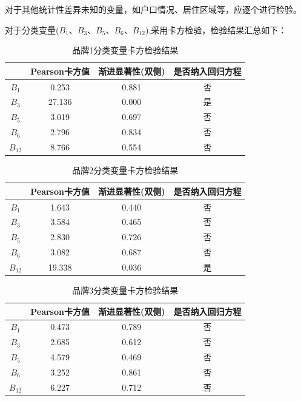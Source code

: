 \documentclass{JXUSTmodeling}
\begin{document}
对于其他统计性差异未知的变量，如户口情况、居住区域等，应逐个进行检验。

对于分类变量($ B_{1} $、$ B_{3} $、$ B_{5} $、$ B_{6} $、$ B_{12} $),采用卡方检验，检验结果汇总如下：
\begin{table}[!htbp]
	\centering 
	\caption{\label{tab:8}品牌1分类变量卡方检验结果}
	\begin{tabular}{cccc}
		\toprule[1.5pt]
		&Pearson卡方值&渐进显著性(双侧)&是否纳入回归方程\\
		\midrule
		$ B_{1} $&0.253&0.881&否\\
		$ B_{3} $&27.136&0.000&是\\
		$ B_{5} $&3.019&0.697&否\\
		$ B_{6} $&2.796&0.834&否\\
		$ B_{12} $&8.766&0.554&否\\
		
		
		\bottomrule[1.5pt]
	\end{tabular}
\end{table}
\begin{table}[!htbp]
	\centering 
	\caption{\label{tab:9}品牌2分类变量卡方检验结果}
	\begin{tabular}{cccc}
		\toprule[1.5pt]
		&Pearson卡方值&渐进显著性(双侧)&是否纳入回归方程\\
		\midrule
		$ B_{1} $&1.643&0.440&否\\
		$ B_{3} $&3.584&0.465&否\\
		$ B_{5} $&2.830&0.726&否\\
		$ B_{6} $&3.082&0.687&否\\
		$ B_{12} $&19.338&0.036&是\\
		
		
		\bottomrule[1.5pt]
	\end{tabular}
\end{table}
\begin{table}[!htbp]
	\centering 
	\caption{\label{tab:10}品牌3分类变量卡方检验结果}
	\begin{tabular}{cccc}
		\toprule[1.5pt]
		&Pearson卡方值&渐进显著性(双侧)&是否纳入回归方程\\
		\midrule
		$ B_{1} $&0.473&0.789&否\\
		$ B_{3} $&2.685&0.612&否\\
		$ B_{5} $&4.579&0.469&否\\
		$ B_{6} $&3.252&0.861&否\\
		$ B_{12} $&6.227&0.712&否\\
		
		
		\bottomrule[1.5pt]
	\end{tabular}
\end{table}
\end{document}
